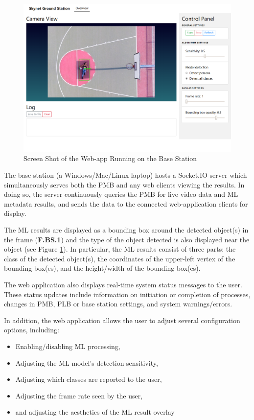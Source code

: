 \begin{figure}[H]
\begin{mdframed}
\centering
\includegraphics[width=15cm]{img/base_station.png}
\end{mdframed}
\caption{Screen Shot of the Web-app Running on the Base Station}
\label{basestationdiag}
\end{figure}

The base station (a Windows/Mac/Linux laptop) hosts a Socket.IO server which simultaneously serves both the PMB and any web clients viewing the results. In doing so, the server continuously queries the PMB for live video data and ML metadata results, and sends the data to the connected web-application clients for display.

The ML results are displayed as a bounding box around the detected object(s) in the frame (\textbf{F.BS.1}) and the type of the object detected is also displayed near the object (see Figure \ref{basestationdiag}). In particular, the ML results consist of three parts: the class of the detected object(s), the coordinates of the upper-left vertex of the bounding box(es), and the height/width of the bounding box(es).

The web application also displays real-time system status messages to the user. These status updates include information on initiation or completion of processes, changes in PMB, PLB or base station settings, and system warnings/errors.

In addition, the web application allows the user to adjust several configuration options, including:

\begin{itemize}
\item Enabling/disabling ML processing,
\item Adjusting the ML model's detection sensitivity,
\item Adjusting which classes are reported to the user,
\item Adjusting the frame rate seen by the user,
\item and adjusting the aesthetics of the ML result overlay
\end{itemize}

